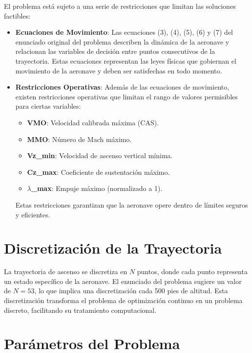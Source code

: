 \documentclass[fleqn]{article}
\begin{document}
El problema está sujeto a una serie de restricciones que limitan las soluciones factibles:

\begin{itemize}
    \item \textbf{Ecuaciones de Movimiento}:  Las ecuaciones (3), (4), (5), (6) y (7) del enunciado original del problema describen la dinámica de la aeronave y relacionan las variables de decisión entre puntos consecutivos de la trayectoria.  Estas ecuaciones representan las leyes físicas que gobiernan el movimiento de la aeronave y deben ser satisfechas en todo momento.

    \item \textbf{Restricciones Operativas}:  Además de las ecuaciones de movimiento, existen restricciones operativas que limitan el rango de valores permisibles para ciertas variables:

        \begin{itemize}
            \item \textbf{VMO}: Velocidad calibrada máxima (CAS).
            \item \textbf{MMO}: Número de Mach máximo.
            \item \textbf{Vz\_min}: Velocidad de ascenso vertical mínima.
            \item \textbf{Cz\_max}: Coeficiente de sustentación máximo.
            \item \textbf{$\lambda$\_max}: Empuje máximo (normalizado a 1).
        \end{itemize}

Estas restricciones garantizan que la aeronave opere dentro de límites seguros y eficientes.
\end{itemize}


\section{Discretización de la Trayectoria}


La trayectoria de ascenso se discretiza en $N$ puntos, donde cada punto representa un estado específico de la aeronave.  El enunciado del problema sugiere un valor de $N=53$, lo que implica una discretización cada 500 pies de altitud.  Esta discretización transforma el problema de optimización continuo en un problema discreto, facilitando su tratamiento computacional.

\section{Parámetros del Problema}
\end{document}
